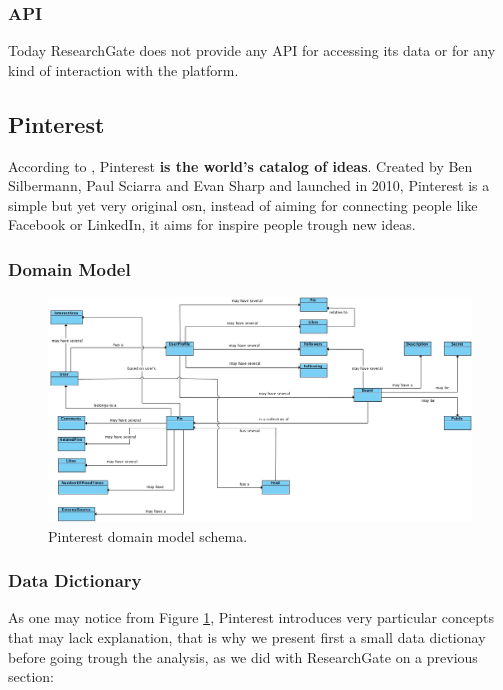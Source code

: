 \subsubsection*{API}
Today ResearchGate does not provide any API for accessing its data or for any kind of interaction with the platform.

\subsection{Pinterest}
According to \cite{pintabout}, Pinterest \textbf{is the world's catalog of ideas}. Created by Ben Silbermann, Paul Sciarra and Evan Sharp and launched in 2010, Pinterest is a simple but yet very original \gls{osn}, instead of aiming for connecting people like Facebook or LinkedIn, it aims for inspire people trough new ideas.

\subsubsection*{Domain Model}

\begin{figure}[h!]
  \hspace*{-1in}
  \includegraphics[width=1.20\textwidth]{img/pinterest-domain-model.jpg}
\caption{\label{img:pintdomain} Pinterest domain model schema.}
\end{figure}

\subsubsection*{Data Dictionary}
As one may notice from Figure \ref{img:pintdomain}, Pinterest introduces very particular concepts that may lack explanation, that is why we present first a small data dictionay before going trough the analysis, as we did with ResearchGate on a previous section:

